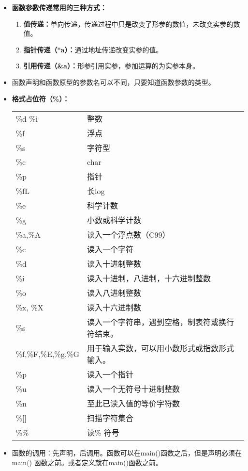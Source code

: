 \documentclass[UTF8]{ctexart}
\begin{document}
\begin{framed}
\begin{itemize}
\begin{itemize}
			\end{itemize}
			\item \textbf{函数参数传递常用的三种方式：}\begin{enumerate}
				\item \textbf{值传递：}单向传递，传递过程中只是改变了形参的数值，未改变实参的数值。
				\item \textbf{指针传递（$*$a）：}通过地址传递改变实参的值。
				\item \textbf{引用传递（\&a）：}形参引用实参，参加运算的为实参本身。
			\end{enumerate}
			\item 函数声明和函数原型的参数名可以不同，只要知道函数参数的类型。
			\item \textbf{格式占位符（\%）：}\begin{tabular*}{\linewidth}{l|l}
				\toprule
				\%d \%i & 整数\\
				\%f & 浮点 \\
				\%s & 字符型 \\
				\%c & char \\
				\%p & 指针 \\
				\%fL & 长log \\
				\%e & 科学计数 \\
				\%g & 小数或科学计数\\
				\%a,\%A & 读入一个浮点数（C99）\\
				\%c & 读入一个字符 \\
				\%d & 读入十进制整数 \\
				\%i & 读入十进制，八进制，十六进制整数\\
				\%o & 读入八进制整数\\
				\%x, \%X & 读入十六进制数 \\
				\%s & 读入一个字符串，遇到空格，制表符或换行符结束。\\
				\%f,\%F,\%E,\%g,\%G & 用于输入实数，可以用小数形式或指数形式输入。\\
				\%p & 读入一个指针 \\
				\%u & 读入一个无符号十进制整数\\
				\%n & 至此已读入值的等价字符数\\
				\%[] & 扫描字符集合 \\
				\%\% & 读\% 符号\\
				\bottomrule
			\end{tabular*}
			\item 函数的调用：先声明，后调用。函数可以在main()函数之后，但是声明必须在main() 函数之前。或者定义就在main()函数之前。
		\end{itemize}
	\end{framed}
\end{document}
